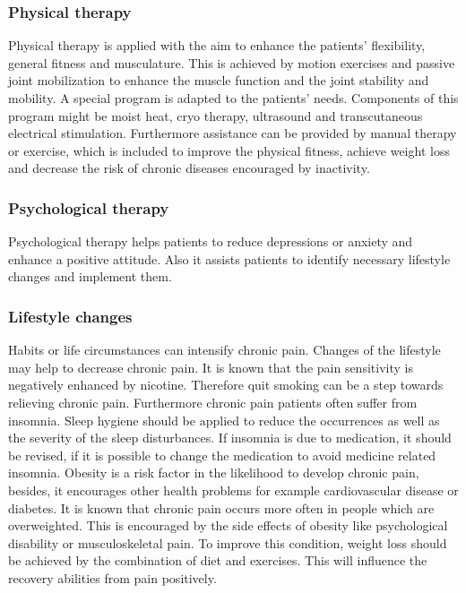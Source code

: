 \subsubsection{Physical therapy}
Physical therapy is applied with the aim to enhance the patients' flexibility, general fitness and musculature. This is achieved by motion exercises and passive joint mobilization to enhance the muscle function and the joint stability and mobility. A special program is adapted to the patients' needs. Components of this program might be moist heat, cryo therapy, ultrasound and transcutaneous electrical stimulation. Furthermore assistance can be provided by manual therapy or exercise, which is included to improve the physical fitness, achieve weight loss and decrease the risk of chronic diseases encouraged by inactivity. \cite{marcus2009,pope2017}

\subsubsection{Psychological therapy}
Psychological therapy helps patients to reduce depressions or anxiety and enhance a positive attitude. Also it assists patients to identify necessary lifestyle changes and implement them. \cite{marcus2009,pope2017}

\subsubsection{Lifestyle changes}
Habits or life circumstances can intensify chronic pain. Changes of the lifestyle may help to decrease chronic pain. It is known that the pain sensitivity is negatively enhanced by nicotine. Therefore quit smoking can be a step towards relieving chronic pain.
Furthermore chronic pain patients often suffer from insomnia. Sleep hygiene should be applied to reduce the occurrences as well as the severity of the sleep disturbances. If insomnia is due to medication, it should be revised, if it is possible to change the medication to avoid medicine related insomnia.
Obesity is a risk factor in the likelihood to  develop chronic pain, besides, it encourages other health problems for example cardiovascular disease or diabetes. It is known that chronic pain occurs more often in people which are overweighted. This is encouraged by the side effects of obesity like psychological disability or musculoskeletal pain. To improve this condition, weight loss should be achieved by the combination of diet and exercises. This will influence the recovery abilities from pain positively. \cite{marcus2009,pope2017}

